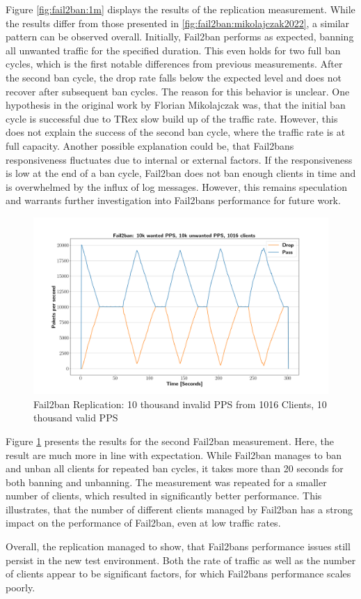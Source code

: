 Figure \ref{fig:fail2ban:1m} displays the results of the replication measurement. While the results differ from those presented in \ref{fig:fail2ban:mikolajczak2022},
a similar pattern can be observed overall. Initially, Fail2ban performs as expected, banning all unwanted traffic for the specified duration. This even holds
for two full ban cycles, which is the first notable differences from previous measurements. After the second ban cycle, the drop rate falls below the expected level and
does not recover after subsequent ban cycles. The reason for this behavior is unclear. One hypothesis in the original work by
Florian Mikolajczak \cite{mikolajczak2022} was, that the initial ban cycle is successful due to TRex slow build up of the traffic rate. However, this does not explain the success
of the second ban cycle, where the traffic rate is at full capacity. Another possible explanation could be, that Fail2bans responsiveness fluctuates due to internal or external factors.
If the responsiveness is low at the end of a ban cycle, Fail2ban does not ban enough clients in time and is overwhelmed by the influx of log messages. However, this remains speculation and warrants
further investigation into Fail2bans performance for future work.
\par
\begin{figure}[h!]
    \centerline{\includegraphics[width=1.2\textwidth]{images/fail2ban_v10k_iv10k_c1016.png}}
    \caption[Fail2Ban Replication: 10k PPS, 1016 Clients]{Fail2ban Replication: 10 thousand invalid \ac{PPS} from 1016 Clients, 10 thousand valid \ac{PPS}}
	\label{fig:fail2ban:10k}
\end{figure}
Figure \ref{fig:fail2ban:10k} presents the results for the second Fail2ban measurement. Here, the result are much more in line with expectation. While Fail2ban manages 
to ban and unban all clients for repeated ban cycles, it takes more than 20 seconds for both banning and unbanning. The measurement was repeated for a smaller number of clients, which
resulted in significantly better performance. This illustrates, that the number of different clients managed by Fail2ban
has a strong impact on the performance of Fail2ban, even at low traffic rates. 
\par 
Overall, the replication managed to show, that Fail2bans performance issues still persist in the new test environment. Both the rate of traffic as well as the number of clients appear
to be significant factors, for which Fail2bans performance scales poorly.  

